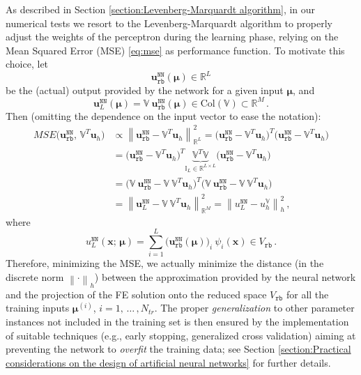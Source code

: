 \documentclass[12pt, a4paper, twoside, openright]{report}
\numberwithin{equation}{chapter}
\theoremstyle{theorem}
\theoremstyle{definition}
\theoremstyle{remark}
\theoremstyle{proposition}
\numberwithin{figure}{chapter}
\newcommand{\norm}[1]{\left\lVert#1\right\rVert}
\newcommand{\bg}[1]{\boldsymbol{#1}}
\begin{document}
		As described in Section \ref{section:Levenberg-Marquardt algorithm}, in our numerical tests we resort to the Levenberg-Marquardt algorithm to properly adjust the weights of the perceptron during the learning phase, relying on the Mean Squared Error (MSE) \eqref{eq:mse} as performance function. To motivate this choice, let 
		\begin{equation*}
			\mathbf{u}_{\texttt{rb}}^{\texttt{NN}}(\bg{\mu}) \in \mathbb{R}^L
		\end{equation*}
		be the (actual) output provided by the network for a given input $\bg{\mu}$, and 
		\begin{equation*}
			\mathbf{u}_L^{\texttt{NN}}(\bg{\mu}) = \mathbb{V} ~ \mathbf{u}_{\texttt{rb}}^{\texttt{NN}}(\bg{\mu}) \in \text{Col}(\mathbb{V}) \subset \mathbb{R}^M \, . 
		\end{equation*}
		Then (omitting the dependence on the input vector to ease the notation):
		\begin{equation}
			\label{eq:pod-nn-mse}
			\begin{aligned}
				MSE \big( \mathbf{u}_{\texttt{rb}}^{\texttt{NN}}, \, \mathbb{V}^T \mathbf{u}_h \big) & \propto \norm{\mathbf{u}_{\texttt{rb}}^{\texttt{NN}} - \mathbb{V}^T \mathbf{u}_h}^2_{\mathbb{R}^L} = \big( \mathbf{u}_{\texttt{rb}}^{\texttt{NN}} - \mathbb{V}^T \mathbf{u}_h \big)^T \big( \mathbf{u}_{\texttt{rb}}^{\texttt{NN}} - \mathbb{V}^T \mathbf{u}_h \big) \\
				& = \big( \mathbf{u}_{\texttt{rb}}^{\texttt{NN}} - \mathbb{V}^T \mathbf{u}_h \big)^T \underbrace{\mathbb{V}^T \mathbb{V}}_{\mathbb{I}_L \in \mathbb{R}^{L \times L}} \big( \mathbf{u}_{\texttt{rb}}^{\texttt{NN}} - \mathbb{V}^T \mathbf{u}_h \big) \\
				& = \big( \mathbb{V} ~ \mathbf{u}_{\texttt{rb}}^{\texttt{NN}} - \mathbb{V} ~ \mathbb{V}^T \mathbf{u}_h \big)^T \big( \mathbb{V} ~ \mathbf{u}_{\texttt{rb}}^{\texttt{NN}} - \mathbb{V} ~ \mathbb{V}^T \mathbf{u}_h \big) \\
				& = \norm{\mathbf{u}_L^{\texttt{NN}} - \mathbb{V} ~ \mathbb{V}^T \mathbf{u}_h}^2_{\mathbb{R}^M} = \norm{u_L^{\texttt{NN}} - u_h^{\mathbb{V}}}^2_h \, ,
			\end{aligned}
		\end{equation} 
		where
		\begin{equation}
			\label{eq:pod-nn-solution}
			u_L^{\texttt{NN}}(\bg{x}; \, \bg{\mu}) = \sum_{i = 1}^L \big( \mathbf{u}_{\texttt{rb}}^{\texttt{NN}}(\bg{\mu}) \big)_i ~ \psi_i(\bg{x}) \in V_{\texttt{rb}} \, .
		\end{equation}
		Therefore, minimizing the MSE, we actually minimize the distance (in the discrete norm $\norm{\cdot}_h$) between the approximation provided by the neural network and the projection of the FE solution onto the reduced space $V_{\texttt{rb}}$ for all the training inputs $\bg{\mu}^{(i)}$, $i = 1, \, \ldots \, , N_{tr}$. The proper \emph{generalization} to other parameter instances not included in the training set is then ensured by the implementation of suitable techniques (e.g., early stopping, generalized cross validation) aiming at preventing the network to \emph{overfit} the training data; see Section \ref{section:Practical considerations on the design of artificial neural networks} for further details.
		
\end{document}
